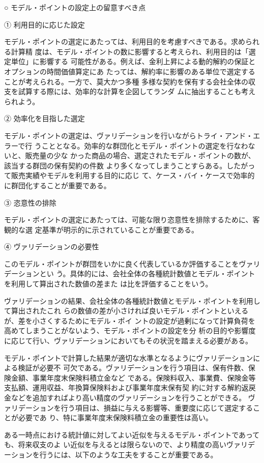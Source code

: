 \documentclass[report,gutter=10mm,fore-edge=10mm,uplatex,dvipdfmx]{jlreq}
\begin{document}
○ モデル・ポイントの設定上の留意すべき点

① 利用目的に応じた設定

モデル・ポイントの選定にあたっては、利用目的を考慮すべきである。求められる計算精
度は、モデル・ポイントの数に影響すると考えられ、利用目的は「選定単位」に影響する
可能性がある。例えば、金利上昇による動的解約の保証とオプションの時間価値算定にあ
たっては、解約率に影響のある単位で選定することが考えられる。一方で、莫大かつ多種
多様な契約を保有する会社全体の収支を試算する際には、効率的な計算を企図してランダ
ムに抽出することも考えられよう。

② 効率化を目指した選定

モデル・ポイントの選定は、ヴァリデーションを行いながらトライ・アンド・エラーで行
うこととなる。効率的な群団化とモデル・ポイントの選定を行なわないと、販売量の少な
かった商品の場合、選定されたモデル・ポイントの数が、該当する群団の保有契約の件数
より多くなってしまうことすらある。したがって販売実績やモデルを利用する目的に応じ
て、ケース・バイ・ケースで効率的に群団化することが重要である。

③ 恣意性の排除

モデル・ポイントの選定にあたっては、可能な限り恣意性を排除するために、客観的な選
定基準が明示的に示されていることが重要である。

④ ヴァリデーションの必要性

このモデル・ポイントが群団をいかに良く代表しているか評価することをヴァリデーションとい
う。具体的には、会社全体の各種統計数値とモデル・ポイントを利用して算出された数値の差また
は比を評価することをいう。

ヴァリデーションの結果、会社全体の各種統計数値とモデル・ポイントを利用して算出されたこれ
らの数値の差が小さければ良いモデル・ポイントといえるが、差を小さくするためにモデル・ポイ
ントの設定が過剰になって計算負荷を高めてしまうことがないよう、モデル・ポイントの設定を分
析の目的や影響度に応じて行い、ヴァリデーションにおいてもその状況を踏まえる必要がある。

モデル・ポイントで計算した結果が適切な水準となるようにヴァリデーションによる検証が必要不
可欠である。ヴァリデーションを行う項目は、保有件数、保険金額、事業年度末保険料積立金など
である。保険料収入、事業費、保険金等支払額、運用収益、年換算保険料および事業年度末保有契
約に対する解約返戻金などを追加すればより高い精度のヴァリデーションを行うことができる。
ヴァリデーションを行う項目は、損益に与える影響等、重要度に応じて選定することが必要であ
り、特に事業年度末保険料積立金の重要性は高い。

ある一時点における統計値に対してよい近似を与えるモデル・ポイントであっても、将来収支のよ
い近似を与えるとは限らないので、より精度の高いヴァリデーションを行うには、以下のような工夫をすることが重要である。
\end{document}
